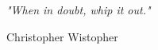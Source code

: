 \newlength\longest

\clearpage

\thispagestyle{empty}
\null\vfill

\settowidth{}
\begin{center}
    \parbox{\longest}{%
        \raggedright{\LARGE\itshape%
            "When in doubt,
            whip it out."\par\bigskip
        }
        \raggedleft\Large{Christopher Wistopher}\par%
    }
\end{center}


\vfill\vfill

\clearpage